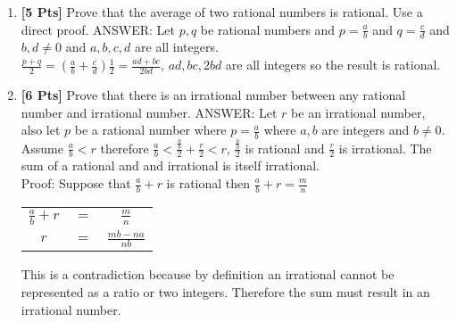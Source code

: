 \documentclass[12pt]{article}
\begin{document}
\begin{enumerate}

\item {\bf [5 Pts]} Prove that the average of two rational numbers is rational. Use a direct proof.\linebreak \linebreak
ANSWER: Let $p, q$ be rational numbers and $p = \frac{a}{b}$ and $q = \frac{c}{d}$ and $b,d \neq 0$ and $a,b,c,d$ are all integers.\\
$\frac{p+q}{2} = (\frac{a}{b} + \frac{c}{d}) \frac{1}{2} = \frac{ad+bc}{2bd}$, $ad, bc, 2bd$ are all integers so the result is rational.

\item {\bf [6 Pts]} Prove that there is an irrational number between any rational number and irrational number.\linebreak \linebreak
ANSWER: Let $r$ be an irrational number, also let $p$ be a rational number where $p = \frac{a}{b}$ where $a,b$ are integers and $b \neq 0$.\\
Assume $\frac{a}{b} < r$ therefore $\frac{a}{b} < \frac{\frac{a}{b}}{2} + \frac{r}{2} < r$, $\frac{\frac{a}{b}}{2}$ is rational and $\frac{r}{2}$ is irrational.
The sum of a rational and and irrational is itself irrational.\\
Proof: Suppose that $\frac{a}{b} + r$ is rational then $\frac{a}{b} + r = \frac{m}{n}$
\begin{table}[h]
\centering
\begin{tabular}{ccc}
$\frac{a}{b} + r$ & $=$ & $\frac{m}{n}$        \\
$r$               & $=$ & $\frac{mb - na}{nb}$ 
\end{tabular}
\end{table}\linebreak
This is a contradiction because by definition an irrational cannot be represented as a ratio or two integers. Therefore the sum must result in an irrational number.



\end{enumerate}
\end{document}
